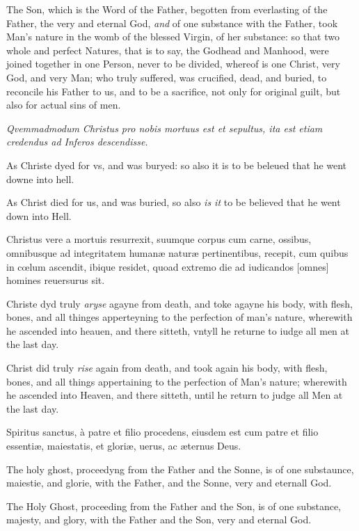 The Son, which is the Word of the Father, begotten from everlasting of the Father, the very and eternal God, \emph{and} of one substance with the Father, took Man's nature in the womb of the blessed Virgin, of her substance: so that two whole and perfect Natures, that is to say, the Godhead and Manhood, were joined together in one Person, never to be divided, whereof is one Christ, very God, and very Man; who truly suffered, was crucified, dead, and buried, to reconcile his Father to us, and to be a sacrifice, not only for original guilt, but also for actual sins of men.


\emph{Qvemmadmodum Christus pro nobis mortuus est et sepultus, ita est etiam credendus ad Inferos descendisse.}

As Christe dyed for vs, and was buryed: so also it is to be beleued that he went downe into hell.

As Christ died for us, and was buried, so also \emph{is it} to be believed that he went down into Hell.


Christus vere a mortuis resurrexit, suumque corpus cum carne, ossibus, omnibusque ad integritatem humanæ naturæ pertinentibus, recepit, cum quibus in cœlum ascendit, ibique residet, quoad extremo die ad iudicandos [omnes] homines reuersurus sit.

Christe dyd truly \emph{aryse} agayne from death, and toke agayne his body, with flesh, bones, and all thinges apperteyning to the perfection of man's nature, wherewith he ascended into heauen, and there sitteth, vntyll he returne to iudge all men at the last day.

Christ did truly \emph{rise} again from death, and took again his body, with flesh, bones, and all things appertaining to the perfection of Man's nature; wherewith he ascended into Heaven, and there sitteth, until he return to judge all Men at the last day.


Spiritus sanctus, à patre et filio procedens, eiusdem est cum patre et filio essentiæ, maiestatis, et gloriæ, uerus, ac æternus Deus.

The holy ghost, proceedyng from the Father and the Sonne, is of one substaunce, maiestie, and glorie, with the Father, and the Sonne, very and eternall God.

The Holy Ghost, proceeding from the Father and the Son, is of one substance, majesty, and glory, with the Father and the Son, very and eternal God.

